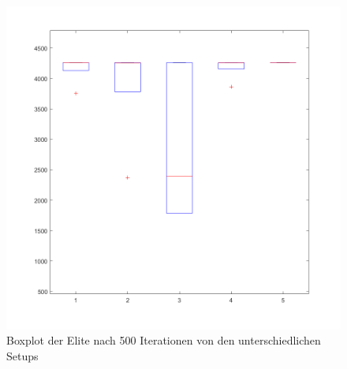 \documentclass{hbrs-ecta-report}
\begin{document}
\begin{figure}[ht!]
	\centering
	\includegraphics[width=\linewidth]{img/Mario_Treshold_boxplot.png}
	\caption{Boxplot der Elite nach 500 Iterationen von den unterschiedlichen Setups}
	\label{fig:treshold_boxplot} 
\end{figure}
\end{document}
